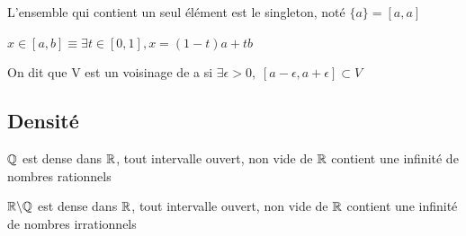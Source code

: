 \documentclass[a4paper, 12pt]{article}
\begin{document}
\begin{remark}
    L'ensemble qui contient un seul élément est le singleton, noté $\{a\} = [a, a]$
\end{remark}

\begin{remark}
    $x \in [a, b] \equiv \exists t \in [0, 1], x = (1-t)a + tb$
\end{remark}

\begin{definition}
    On dit que V est un voisinage de a si $\exists \epsilon \gt 0, \; [a - \epsilon, a + \epsilon] \subset V$
\end{definition}

\subsection{Densité}

\begin{theorem}
    $\mathbb{Q}$ est dense dans $\mathbb{R}$, tout intervalle ouvert, non vide de $\mathbb{R}$ contient une infinité de nombres rationnels
\end{theorem}
\begin{theorem}
    $\mathbb{R} \backslash \mathbb{Q}$ est dense dans $\mathbb{R}$, tout intervalle ouvert, non vide de $\mathbb{R}$ contient une infinité de nombres irrationnels
\end{theorem}
\end{document}
